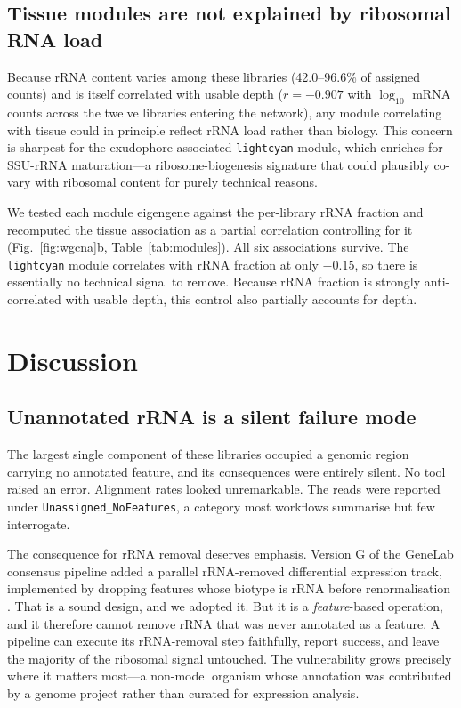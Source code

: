 \subsection{Tissue modules are not explained by ribosomal RNA load}

Because rRNA content varies among these libraries (42.0--96.6\% of assigned counts) and is
itself correlated with usable depth ($r=-0.907$ with $\log_{10}$ mRNA counts across the twelve
libraries entering the network), any module
correlating with tissue could in principle reflect rRNA load rather than biology. This concern
is sharpest for the exudophore-associated \texttt{lightcyan} module, which enriches for
SSU-rRNA maturation---a ribosome-biogenesis signature that could plausibly co-vary with
ribosomal content for purely technical reasons.

We tested each module eigengene against the per-library rRNA fraction and recomputed the
tissue association as a partial correlation controlling for it
(Fig.~\ref{fig:wgcna}b, Table~\ref{tab:modules}). All six associations survive. The
\texttt{lightcyan} module correlates with rRNA fraction at only $-0.15$, so there is
essentially no technical signal to remove. Because rRNA fraction is strongly anti-correlated
with usable depth, this control also partially accounts for depth.

\section{Discussion}

\subsection{Unannotated rRNA is a silent failure mode}

The largest single component of these libraries occupied a genomic region carrying no
annotated feature, and its consequences were entirely silent. No tool raised an error.
Alignment rates looked unremarkable. The reads were reported under
\texttt{Unassigned\_NoFeatures}, a category most workflows summarise but few interrogate.

The consequence for rRNA removal deserves emphasis. Version G of the GeneLab consensus
pipeline added a parallel rRNA-removed differential expression track, implemented by dropping
features whose biotype is rRNA before renormalisation \cite{genelab7101G}. That is a sound
design, and we adopted it. But it is a \emph{feature}-based operation, and it therefore cannot
remove rRNA that was never annotated as a feature. A pipeline can execute its rRNA-removal step
faithfully, report success, and leave the majority of the ribosomal signal untouched. The
vulnerability grows precisely where it matters most---a non-model organism whose annotation was
contributed by a genome project rather than curated for expression analysis.

